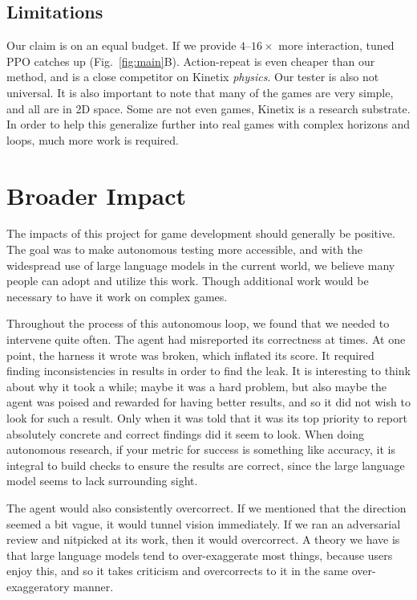 \documentclass{article}
\begin{document}
\subsection{Limitations}
\label{sec:limits}
Our claim is on an equal budget. If we provide $4$--$16\times$ more interaction, tuned PPO catches up
(Fig.~\ref{fig:main}B). Action-repeat is even cheaper than our method, and is a close competitor on Kinetix \emph{physics}. Our tester is also not universal. It is also important to note that many of the games are very simple, and all are in 2D space. Some are not even games, Kinetix is a research substrate. In order to help this generalize further into real games with complex horizons and loops, much more work is required.

\section{Broader Impact}
The impacts of this project for game development should generally be positive. The goal was to make autonomous testing more
accessible, and with the widespread use of large language models in the current world, we believe many people can adopt and
utilize this work. Though additional work would be necessary to have it work on complex games.

Throughout the process of this autonomous loop, we found that we needed to intervene quite often. The agent had misreported
its correctness at times. At one point, the harness it wrote was broken, which inflated its score. It required finding inconsistencies in results in order to find the leak. It is interesting to think about why it took a while; maybe it was a
hard problem, but also maybe the agent was poised and rewarded for having better results, and so it did not wish to look for such
a result. Only when it was told that it was its top priority to report absolutely concrete and correct findings did it seem
to look. When doing autonomous research, if your metric for success is something like accuracy, it is integral to build
checks to ensure the results are correct, since the large language model seems to lack surrounding sight.

The agent would also consistently overcorrect. If we mentioned that the direction seemed a bit vague, it would tunnel
vision immediately. If we ran an adversarial review and nitpicked at its work, then it would overcorrect. A theory we have
is that large language models tend to over-exaggerate most things, because users enjoy this, and so it takes criticism and
overcorrects to it in the same over-exaggeratory manner.
\end{document}
